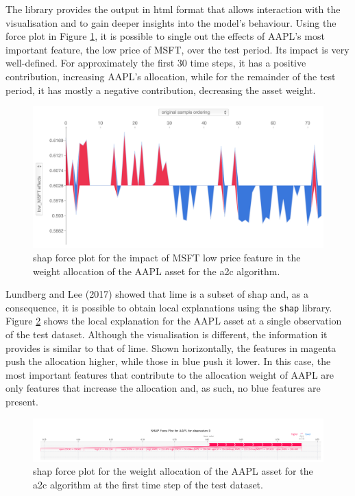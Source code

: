 The library provides the output in \acrfull{html} format that allows interaction with the visualisation and to gain deeper insights into the model's behaviour. Using the force plot in Figure \ref{fig:a2c_shap_forceplot_aapl_lowmsft}, it is possible to single out the effects of AAPL's most important feature, the low price of MSFT, over the test period. Its impact is very well-defined. For approximately the first 30 time steps, it has a positive contribution, increasing AAPL's allocation, while for the remainder of the test period, it has mostly a negative contribution, decreasing the asset weight.

\begin{figure}
    \centering
    \includegraphics[width=\textwidth]{figures/a2c_shap_forceplot_aapl_lowmsft.png}
    \caption{\acrshort{shap} force plot for the impact of MSFT low price feature in the weight allocation of the AAPL asset for the \acrshort{a2c} algorithm.}
    \label{fig:a2c_shap_forceplot_aapl_lowmsft}
\end{figure}

Lundberg and Lee (2017) \cite{Lundberg2017} showed that \acrshort{lime} is a subset of \acrshort{shap} and, as a consequence, it is possible to obtain local explanations using the \texttt{shap} library. Figure \ref{fig:a2c_shap_forceplot_singleobs_aapl} shows the local explanation for the AAPL asset at a single observation of the test dataset. Although the visualisation is different, the information it provides is similar to that of \acrshort{lime}. Shown horizontally, the features in magenta push the allocation higher, while those in blue push it lower. In this case, the most important features that contribute to the allocation weight of AAPL are only features that increase the allocation and, as such, no blue features are present.

\begin{figure}
    \centering
    \includegraphics[width=\textwidth]{figures/a2c_shap_forceplot_singleobs_aapl.png}
    \caption{\acrshort{shap} force plot for the weight allocation of the AAPL asset for the \acrshort{a2c} algorithm at the first time step of the test dataset.}
    \label{fig:a2c_shap_forceplot_singleobs_aapl}
\end{figure}